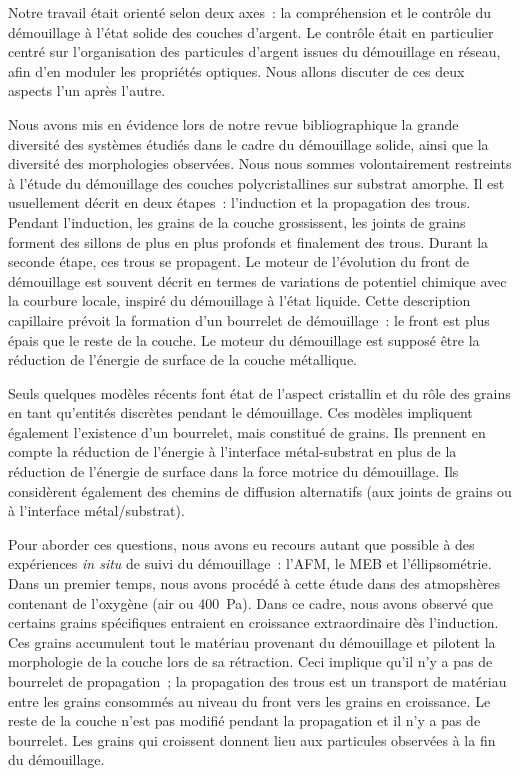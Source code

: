 \newpage\null\thispagestyle{empty}\newpage
Notre travail était orienté selon deux axes~: la compréhension et le contrôle du démouillage à l'état solide des couches d'argent. Le contrôle était en particulier centré sur l'organisation des particules d'argent issues du démouillage en réseau, afin d'en moduler les propriétés optiques. Nous allons discuter de ces deux aspects l'un après l'autre.\par \vspace{12pt}
Nous avons mis en évidence lors de notre revue bibliographique la grande diversité des systèmes étudiés dans le cadre du démouillage solide, ainsi que la diversité des morphologies observées. Nous nous sommes volontairement restreints à l'étude du démouillage des couches polycristallines sur substrat amorphe. Il est usuellement décrit en deux étapes~: l'induction et la propagation des trous. Pendant l'induction, les grains de la couche grossissent, les joints de grains forment des sillons de plus en plus profonds et finalement des trous. Durant la seconde étape, ces trous se propagent. Le moteur de l'évolution du front de démouillage est souvent décrit en termes de variations de potentiel chimique avec la  courbure locale, inspiré du démouillage à l'état liquide. Cette description capillaire prévoit la formation d'un bourrelet de démouillage~: le front est plus épais que le reste de la couche. Le moteur du démouillage est supposé être la réduction de l'énergie de surface de la couche métallique.\par 
Seuls quelques modèles récents font état de l'aspect cristallin et du rôle des grains en tant qu'entités discrètes pendant le démouillage. Ces modèles impliquent également l'existence d'un bourrelet, mais constitué de grains. Ils prennent en compte la réduction de l'énergie à l'interface métal-substrat en plus de la réduction de l'énergie de surface dans la force motrice du démouillage. Ils considèrent également des chemins de diffusion alternatifs (aux joints de grains ou à l'interface métal/substrat).\par 
Pour aborder ces questions, nous avons eu recours autant que possible à des expériences \textit{in situ} de suivi du démouillage~: l'AFM, le MEB et l'éllipsométrie. Dans un premier temps, nous avons procédé à cette étude dans des atmopshères contenant de l'oxygène (air ou 400~Pa). Dans ce cadre, nous avons observé que certains grains spécifiques entraient en croissance extraordinaire dès l'induction. Ces grains accumulent tout le matériau provenant du démouillage et pilotent la morphologie de la couche lors de sa rétraction. Ceci implique qu'il n'y a pas de bourrelet de propagation~; la propagation des trous est un transport de matériau entre les grains consommés au niveau du front vers les grains en croissance. Le reste de la couche n'est pas modifié pendant la propagation et il n'y a pas de bourrelet. Les grains qui croissent donnent lieu aux particules observées à la fin du démouillage.\par 
